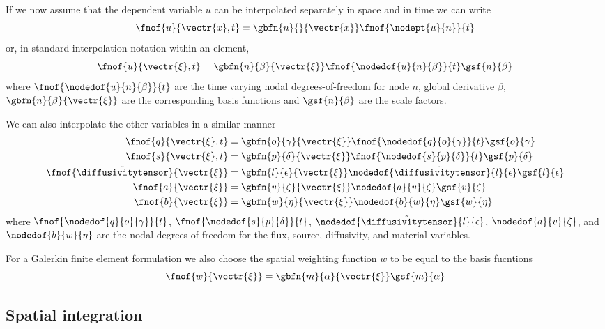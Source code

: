 If we now assume that the dependent variable $u$ can be interpolated
separately in space and in time we can write
\begin{equation}
  \fnof{u}{\vectr{x},t}=\gbfn{n}{}{\vectr{x}}\fnof{\nodept{u}{n}}{t}
\end{equation}
or, in standard interpolation notation within an element,
\begin{equation}
  \fnof{u}{\vectr{\xi},t}=\gbfn{n}{\beta}{\vectr{\xi}}
  \fnof{\nodedof{u}{n}{\beta}}{t}\gsf{n}{\beta}
\end{equation}
where $\fnof{\nodedof{u}{n}{\beta}}{t}$ are the time varying nodal
degrees-of-freedom for node $n$, global derivative $\beta$,
$\gbfn{n}{\beta}{\vectr{\xi}}$ are the corresponding basis functions 
and $\gsf{n}{\beta}$ are the scale factors. 

We can also interpolate the other variables in a similar manner \ie
\begin{equation}
  \begin{split}
    \fnof{q}{\vectr{\xi},t} &= \gbfn{o}{\gamma}{\vectr{\xi}}\fnof{\nodedof{q}{o}{\gamma}}{t}\gsf{o}{\gamma} \\
    \fnof{s}{\vectr{\xi},t} &= \gbfn{p}{\delta}{\vectr{\xi}}\fnof{\nodedof{s}{p}{\delta}}{t}\gsf{p}{\delta} \\
    \fnof{\tilde{\diffusivitytensor}}{\vectr{\xi}} &=\gbfn{l}{\epsilon}{\vectr{\xi}}
    \nodedof{\tilde{\diffusivitytensor}}{l}{\epsilon}\gsf{l}{\epsilon} \\
    \fnof{a}{\vectr{\xi}} &=\gbfn{v}{\zeta}{\vectr{\xi}}\nodedof{a}{v}{\zeta}\gsf{v}{\zeta} \\
    \fnof{b}{\vectr{\xi}} &=\gbfn{w}{\eta}{\vectr{\xi}}\nodedof{b}{w}{\eta}\gsf{w}{\eta} 
  \end{split}
\end{equation}
where $\fnof{\nodedof{q}{o}{\gamma}}{t}$,
$\fnof{\nodedof{s}{p}{\delta}}{t}$,
$\nodedof{\tilde{\diffusivitytensor}}{l}{\epsilon}$,
$\nodedof{a}{v}{\zeta}$, and $\nodedof{b}{w}{\eta}$ are the nodal
degrees-of-freedom for the flux, source, diffusivity, and material
variables.

For a Galerkin finite element formulation we also choose the spatial weighting
function $w$ to be equal to the basis fucntions \ie
\begin{equation}
  \fnof{w}{\vectr{\xi}}=\gbfn{m}{\alpha}{\vectr{\xi}}\gsf{m}{\alpha}
\end{equation}

\subsection{Spatial integration}
\label{subsec:ReactionDiffusionSpatialIntegration}

